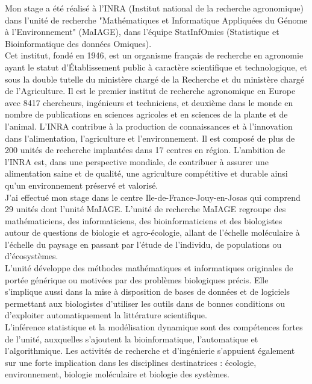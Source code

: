 \documentclass[11pt,a4paper]{article} %
\begin{document}
Mon stage a été réalisé à l'INRA (Institut national de la recherche agronomique) dans l'unité de recherche "Mathématiques et Informatique Appliquées du Génome à l'Environnement" (MaIAGE), dans l'équipe StatInfOmics (Statistique et Bioinformatique des données Omiques).\\
Cet institut, fondé en 1946, est un organisme français de recherche en agronomie ayant le statut d’Établissement public à caractère scientifique et technologique, et sous la double tutelle du ministère chargé de la Recherche et du ministère chargé de l’Agriculture. Il est le premier institut de recherche agronomique en Europe avec 8417 chercheurs, ingénieurs et techniciens, et deuxième dans le monde en nombre de publications en sciences agricoles et en sciences de la plante et de l'animal. L'INRA contribue à la production de connaissances et à l'innovation dans l'alimentation, l'agriculture et l'environnement. Il est composé de plus de 200 unités de recherche implantées dans 17 centres en région. L'ambition de l'INRA est, dans une perspective mondiale, de contribuer à assurer une alimentation saine et de qualité, une agriculture compétitive et durable ainsi qu'un environnement préservé et valorisé.\\
J'ai effectué mon stage dans le centre Ile-de-France-Jouy-en-Josas qui comprend 29 unités dont l'unité MaIAGE. L'unité de recherche MaIAGE regroupe des mathématiciens, des informaticiens, des bioinformaticiens et des biologistes autour de questions de biologie et agro-écologie, allant de l'échelle moléculaire à l'échelle du paysage en passant par l'étude de l'individu, de populations ou d'écosystèmes.\\
L'unité développe des méthodes mathématiques et informatiques originales de portée générique ou motivées par des problèmes biologiques précis. Elle s'implique aussi dans la mise à disposition de bases de données et de logiciels permettant aux biologistes d'utiliser les outils dans de bonnes conditions ou d'exploiter automatiquement la littérature scientifique. \\
L'inférence statistique et la modélisation dynamique sont des compétences fortes de l'unité, auxquelles s'ajoutent la bioinformatique, l'automatique et l'algorithmique. Les activités de recherche et d'ingénierie s'appuient également sur une forte implication dans les disciplines destinatrices : écologie, environnement, biologie moléculaire et biologie des systèmes.\\

\newpage
\end{document}

